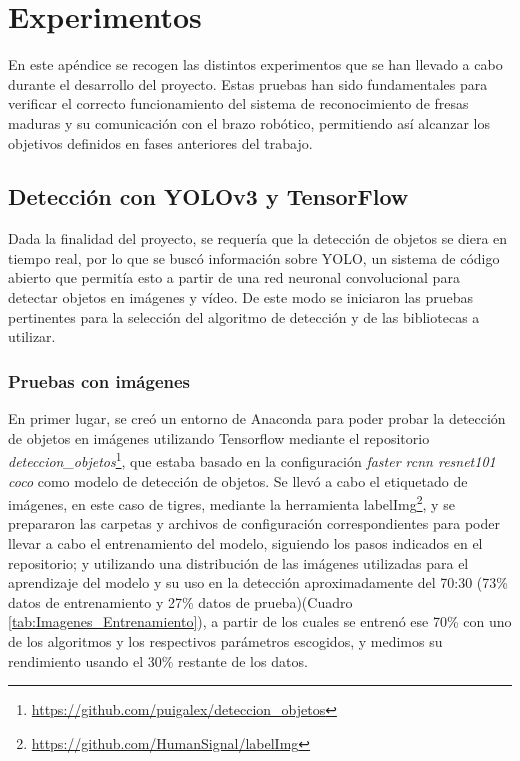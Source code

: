 \chapter{Experimentos}
\label{cap:capitulo7}

En este apéndice se recogen las distintos experimentos que se han llevado a cabo durante el desarrollo del proyecto. Estas pruebas han sido fundamentales para verificar el correcto funcionamiento del sistema de reconocimiento de fresas maduras y su comunicación con el brazo robótico, permitiendo así alcanzar los objetivos definidos en fases anteriores del trabajo.

\section{Detección con YOLOv3 y TensorFlow}
\label{exp_seleccion_algoritmo}

Dada la finalidad del proyecto, se requería que la detección de objetos se diera en tiempo real, por lo que se buscó información sobre YOLO, un sistema de código abierto que permitía esto a partir de una red neuronal convolucional para detectar objetos en imágenes y vídeo. De este modo se iniciaron las pruebas pertinentes para la selección del algoritmo de detección y de las bibliotecas a utilizar.

\subsection{Pruebas con imágenes}
\label{sec:Pruebas_imgs_TF}

En primer lugar, se creó un entorno de Anaconda para poder probar la detección de objetos en imágenes utilizando Tensorflow mediante el repositorio \textit{deteccion\_objetos}\footnote{\url{https://github.com/puigalex/deteccion_objetos}}, que estaba basado en la configuración \textit{faster rcnn resnet101 coco} como modelo de detección de objetos. Se llevó a cabo el etiquetado de imágenes, en este caso de tigres, mediante la herramienta labelImg\footnote{\url{https://github.com/HumanSignal/labelImg}}, y se prepararon las carpetas y archivos de configuración correspondientes para poder llevar a cabo el entrenamiento del modelo, siguiendo los pasos indicados en el repositorio; y utilizando una distribución de las imágenes utilizadas para el aprendizaje del modelo y su uso en la detección aproximadamente del 70:30 (73\% datos de entrenamiento y 27\% datos de prueba)(Cuadro \ref{tab:Imagenes_Entrenamiento}), a partir de los cuales se entrenó ese 70\% con uno de los algoritmos y los respectivos parámetros escogidos, y medimos su rendimiento usando el 30\% restante de los datos.

